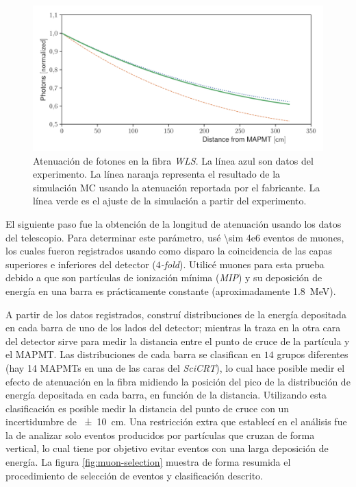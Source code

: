 \begin{figure}
        \centering
        \includegraphics[width=\textwidth]{data_atlength.pdf}
        \caption{Atenuación de fotones en la fibra \emph{WLS}. La línea azul son datos del experimento. La línea naranja representa el resultado de la simulación MC usando la atenuación reportada por el fabricante. La línea verde es el ajuste de la simulación a partir del experimento.}
        \label{fig:atlength}
\end{figure}

El siguiente paso fue la obtención de la longitud de atenuación usando los datos del telescopio. Para determinar este parámetro, usé \num{\sim 4e6} eventos de muones, los cuales fueron registrados usando como disparo la coincidencia de las capas superiores e inferiores del detector (\emph{$4$-fold}). Utilicé muones para esta prueba debido a que son partículas de ionización mínima (\emph{MIP}) y su deposición de energía en una barra es prácticamente constante (aproximadamente \SI{1.8}{\mega\electronvolt}).

A partir de los datos registrados, construí distribuciones de la energía depositada en cada barra de uno de los lados del detector; mientras la traza en la otra cara del detector sirve para medir la distancia entre el punto de cruce de la partícula y el MAPMT. Las distribuciones de cada barra se clasifican en $14$ grupos diferentes (hay \num{14} MAPMTs en una de las caras del \emph{SciCRT}), lo cual hace posible medir el efecto de atenuación en la fibra midiendo la posición del pico de la distribución de energía depositada en cada barra, en función de la distancia. Utilizando esta clasificación es posible medir la distancia del punto de cruce con un incertidumbre de \SI{\pm 10}{\cm}. Una restricción extra que establecí en el análisis fue la de analizar solo eventos producidos por partículas que cruzan de forma vertical, lo cual tiene por objetivo evitar eventos con una larga deposición de energía. La figura \ref{fig:muon-selection} muestra de forma resumida el procedimiento de selección de eventos y clasificación descrito.

